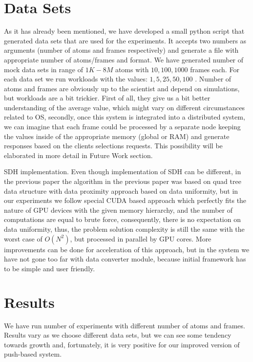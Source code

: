 \documentclass[12pt,letterpaper]{report}
\begin{document}
\section{Data Sets}

\hspace{3em} As it has already been mentioned, we have developed a small python script that generated data sets that are used for the experiments. It accepts two numbers as arguments (number of atoms and frames respectively) and generate a file with appropriate number of atoms/frames and format. We have generated number of mock data sets in range of $1K-8M$ atoms with $10, 100, 1000$ frames each. For each data set we run workloads with the values: $1, 5, 25, 50, 100$ . Number of atoms and frames are obviously up to the scientist and depend on simulations, but workloads are a bit trickier. First of all, they give us a bit better understanding of the average value, which might vary on different circumstances related to OS, secondly, once this system is integrated into a distributed system, we can imagine that each frame could be processed by a separate node keeping the values inside of the appropriate memory (global or RAM) and generate responses based on the clients selections requests. This possibility will be elaborated in more detail in Future Work section.



\noindent\hspace{3em}SDH implementation. Even though implementation of SDH can be different, in the previous paper the algorithm in the previous paper was based on quad tree data structure with data proximity approach based on data uniformity\cite{mainPaper}, but in our experiments we follow special CUDA based approach which perfectly fits the nature of GPU devices with the given memory hierarchy, and the number of computations are equal to brute force, consequently, there is no expectation on data uniformity, thus, the problem solution complexity is still the same with the worst case of $O(N^2)$, but processed in parallel by GPU cores. More improvements can be done for acceleration of this approach, but in the system we have not gone too far with data converter module, because initial framework has to be simple and user friendly.

\section{Results}

\noindent\hspace{3em} We have run number of experiments with different number of atoms and frames. Results vary as we choose different data sets, but we can see some tendency towards growth and, fortunately, it is very positive for our improved version of push-based system.
\end{document}
